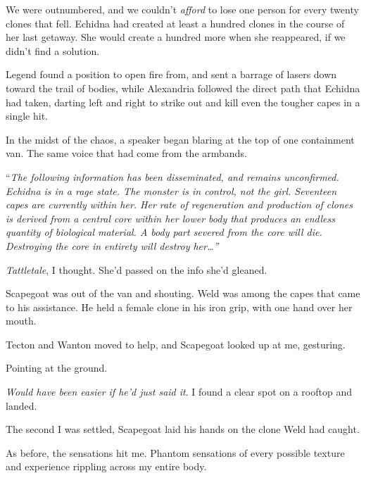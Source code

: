 We were outnumbered, and we couldn't \emph{afford} to lose one person for every twenty clones that fell.  Echidna had created at least a hundred clones in the course of her last getaway.  She would create a hundred more when she reappeared, if we didn't find a solution.



Legend found a position to open fire from, and sent a barrage of lasers down toward the trail of bodies, while Alexandria followed the direct path that Echidna had taken, darting left and right to strike out and kill even the tougher capes in a single hit.



In the midst of the chaos, a speaker began blaring at the top of one containment van.  The same voice that had come from the armbands.



``\emph{The following information has been disseminated, and remains unconfirmed.  Echidna is in a rage state.  The monster is in control, not the girl.  Seventeen capes are currently within her.  Her rate of regeneration and production of clones is derived from a central core within her lower body that produces an endless quantity of biological material.  A body part severed from the core will die.  Destroying the core in entirety will destroy her\ldots''}



\emph{Tattletale}, I thought.  She'd passed on the info she'd gleaned.



Scapegoat was out of the van and shouting.  Weld was among the capes that came to his assistance.  He held a female clone in his iron grip, with one hand over her mouth.



Tecton and Wanton moved to help, and Scapegoat looked up at me, gesturing.



Pointing at the ground.



\emph{Would have been easier if he'd just said it}.  I found a clear spot on a rooftop and landed.



The second I was settled, Scapegoat laid his hands on the clone Weld had caught.



As before, the sensations hit me.  Phantom sensations of every possible texture and experience rippling across my entire body.



